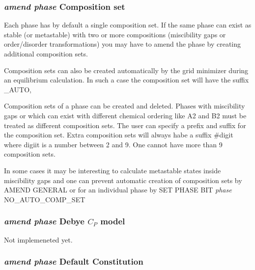 \documentclass[12pt]{article}
\begin{document}
\subsubsection{{\em amend phase} Composition set}

Each phase has by default a single composition set.  If the same phase
can exist as stable (or metastable) with two or more compositions
(miscibility gaps or order/disorder transformations) you may have to
amend the phase by creating additional composition sets.  

Composition sets can also be created automatically by the grid
minimizer during an equilibrium calculation.  In such a case the
composition set will have the suffix \_AUTO,

Composition sets of a phase can be created and deleted.  Phases with
miscibility gaps or which can exist with different chemical ordering
like A2 and B2 must be treated as different composition sets.  The
user can specify a prefix and suffix for the composition set.  Extra
composition sets will always habe a suffix \#digit where digiit is a
number between 2 and 9.  One cannot have more than 9 composition sets.

In some cases it may be interesting to calculate metastable states
inside miscibility gaps and one can prevent automatic creation of
composition sets by {\rm AMEND GENERAL} or for an individual phase by
{\rm SET PHASE BIT {\em phase} NO\_AUTO\_COMP\_SET}

\subsubsection{{\em amend phase} Debye $C_P$ model}

Not implemeneted yet.

\subsubsection{{\em amend phase} Default Constitution}
\end{document}

